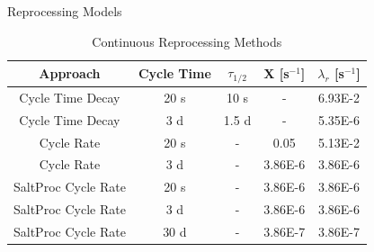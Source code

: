 \documentclass[final]{beamer}
\newlength{\onecolwid}
\newlength{\threecolwid}
\begin{document}
\begin{frame}[t]
\begin{columns}[t,totalwidth=\threecolwid]
\begin{column}{\onecolwid}
\begin{block}{Reprocessing Models}
\begin{table}[H]
\renewcommand{\arraystretch}{1.25}
\caption{Continuous Reprocessing Methods}
\label{tab:cont_methods}
\begin{center}
\begin{tabular}{ | c | c | c | c | c | }
 \hline
	Approach & Cycle Time & $\tau_{1/2}$ & X [s$^{-1}$] & $\lambda_{r}$ [s$^{-1}$]\\
 \hline
 \hline
 Cycle Time Decay & 20 s & 10 s & - & 6.93E-2\\
 Cycle Time Decay & 3 d & 1.5 d & - & 5.35E-6\\
 Cycle Rate & 20 s & - & 0.05 & 5.13E-2\\
 Cycle Rate & 3 d & - & 3.86E-6 & 3.86E-6\\
 SaltProc Cycle Rate & 20 s & - & 3.86E-6 & 3.86E-6\\
 SaltProc Cycle Rate & 3 d & - & 3.86E-6 & 3.86E-6\\
 SaltProc Cycle Rate & 30 d & - & 3.86E-7 & 3.86E-7\\
 
 \hline
\end{tabular}
\end{center}
\end{table}



%
% 



\end{block}
\end{column}
\end{columns}
\end{frame}
\end{document}
